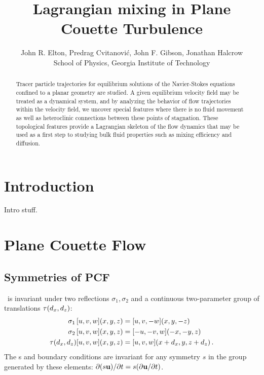 \documentclass[letter,10pt,openany]{article}
\title{
Lagrangian mixing in Plane Couette Turbulence
        }
\author{
John R. Elton,
Predrag Cvitanovi\'{c},
John F. Gibson,
Jonathan Halcrow 
\vspace*{.15em}\\
  {\small School of Physics, Georgia Institute of Technology}
    }
\date{}
\begin{document}
\maketitle

\begin{abstract}
\noindent 
Tracer particle trajectories for equilibrium solutions of the Navier-Stokes equations confined to a planar geometry are studied. A given equilibrium velocity field may be treated as a dynamical system, and by analyzing the behavior of flow trajectories within the velocity field, we uncover special features where there is no fluid movement as well as heteroclinic connections between these points of stagnation. These topological features provide a Lagrangian skeleton of the flow dynamics that may be used as a first step to studying bulk fluid properties such as mixing efficiency and diffusion.
\end{abstract}



\section{Introduction}
\label{sec:intro}

Intro stuff.



\section{Plane Couette Flow}
\label{sec:PCF}

\subsection{Symmetries of PCF}
\label{PCF_symm}

\PCf\ is invariant under two reflections $\sigma_1,\sigma_2$ and a
continuous two-parameter group of translations $\tau(d_x, d_z)$:
\begin{align}
\sigma_1 \, [u,v,w](x,y,z) &= [u, v,-w](x,y,-z) \nonumber \\
\sigma_2 \, [u,v,w](x,y,z) &= [-u,-v,w](-x,-y,z)  \label{reflSfit1}\\
\tau(d_x, d_z)[u,v,w](x,y,z) &= [u,v,w](x+d_x,y,z+d_z) \nonumber\,.
\end{align}
The \NSe s and boundary conditions are invariant for any symmetry $s$
in the group generated by these elements:
$\partial (s {\bf u}) / \partial t = s (\partial {\bf u} / \partial t)$.
\end{document}
